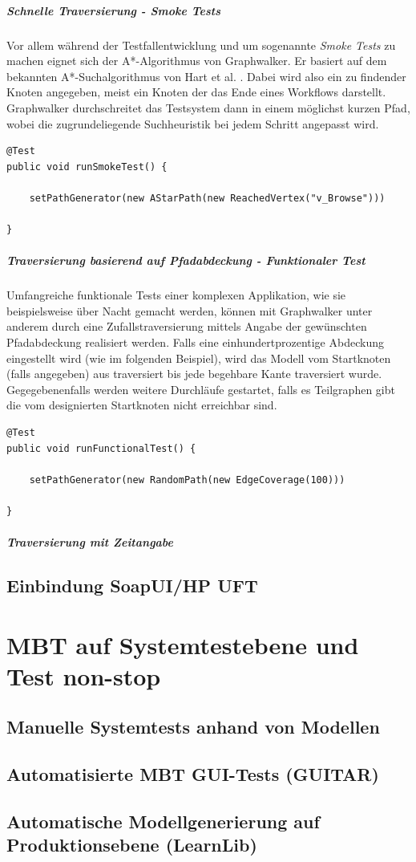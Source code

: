 \subparagraph{Schnelle Traversierung - Smoke Tests}
Vor allem während der Testfallentwicklung und um sogenannte \textit{Smoke Tests} zu machen eignet sich der A*-Algorithmus von Graphwalker. Er basiert auf dem bekannten A*-Suchalgorithmus von Hart et al. \cite{hart_ucorrection/u_1972}. Dabei wird also ein zu findender Knoten angegeben, meist ein Knoten der das Ende eines Workflows darstellt. Graphwalker durchschreitet das Testsystem dann in einem möglichst kurzen Pfad, wobei die zugrundeliegende Suchheuristik bei jedem Schritt angepasst wird.

\begin{verbatim}
@Test
public void runSmokeTest() {
    
    setPathGenerator(new AStarPath(new ReachedVertex("v_Browse")))
    
}
\end{verbatim}

\subparagraph{Traversierung basierend auf Pfadabdeckung - Funktionaler Test}
Umfangreiche funktionale Tests einer komplexen Applikation, wie sie beispielsweise über Nacht gemacht werden, können mit Graphwalker unter anderem durch eine Zufallstraversierung mittels Angabe der gewünschten Pfadabdeckung realisiert werden. Falls eine einhundertprozentige Abdeckung eingestellt wird (wie im folgenden Beispiel), wird das Modell vom Startknoten (falls angegeben) aus traversiert bis jede begehbare Kante traversiert wurde. Gegegebenenfalls werden weitere Durchläufe gestartet, falls es Teilgraphen gibt die vom designierten Startknoten nicht erreichbar sind. 

\begin{verbatim}
@Test
public void runFunctionalTest() {
    
    setPathGenerator(new RandomPath(new EdgeCoverage(100)))
    
}
\end{verbatim}

\subparagraph{Traversierung mit Zeitangabe}

\subsection{Einbindung SoapUI/HP UFT}


\section{MBT auf Systemtestebene und Test non-stop}
\subsection{Manuelle Systemtests anhand von Modellen}
\subsection{Automatisierte MBT GUI-Tests (GUITAR)}
\subsection{Automatische Modellgenerierung auf Produktionsebene (LearnLib)}